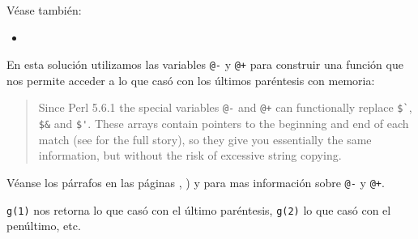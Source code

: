 Véase también:
\begin{itemize}
\item {}
\end{itemize}


En esta solución utilizamos 
las variables \verb|@-| y \verb|@+| para construir una función que nos 
permite acceder a lo que casó con 
los últimos paréntesis con memoria:
 
\begin{it}\begin{quotation}
Since Perl 5.6.1 the special variables \verb|@-| and \verb|@+| can functionally replace
\verb|$`|, \verb|$&| and \verb|$'|. These arrays contain pointers to the beginning and end of
each match (see  for the full story), so they give you essentially
the same information, but without the risk of excessive string copying.
\end{quotation}\end{it}

Véanse los párrafos en las páginas
\pageref{parrafo:fincas}, \pageref{parrafo:iniciocas}) y
\pageref{parrafo:lastpar} para mas información sobre \verb|@-| y \verb|@+|.

\verb|g(1)| nos retorna lo que casó con el último paréntesis,
\verb|g(2)| lo que casó con el penúltimo, etc.

